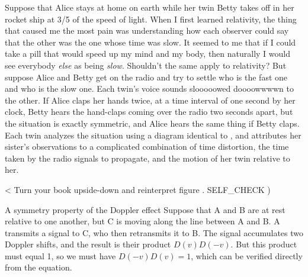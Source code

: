 Suppose that Alice stays at home on earth while her twin Betty takes off in her rocket ship at 3/5 of the speed of light.
When I first learned relativity, the thing that caused me the most pain was understanding how each observer could say that the
other was the one whose time was slow. It seemed to me that if I could take a pill that would speed up my mind and my body,
then naturally I would see everybody \emph{else} as being \emph{slow}. Shouldn't the same apply to relativity? But suppose Alice and Betty
get on the radio and try to settle who is the fast one and who is the slow one. Each twin's voice sounds slooooowed doooowwwwn
to the other. If Alice claps her hands twice, at a time interval of one second by her clock, Betty hears the hand-claps coming
over the radio two seconds apart, but the situation is exactly symmetric, and Alice hears the same thing if Betty claps.
Each twin analyzes the situation using a diagram identical to , and attributes her sister's
observations to a complicated combination of time distortion, the time taken by the radio signals to propagate, and
the motion of her twin relative to her.

\pagebreak

<%
Turn your book upside-down and reinterpret figure .
  SELF_CHECK
  ) %


\begin{eg}{A symmetry property of the Doppler effect}\label{eg:doppler-abc}
Suppose that A and B are at rest relative to one another, but C is moving along the line between A and B. A transmits a signal
to C, who then retransmits it to B. The signal accumulates two Doppler shifts, and the result is their product $D(v)D(-v)$. But
this product must equal 1, so we must have $D(-v)D(v)=1$, which can be verified directly from the equation.
\end{eg}

